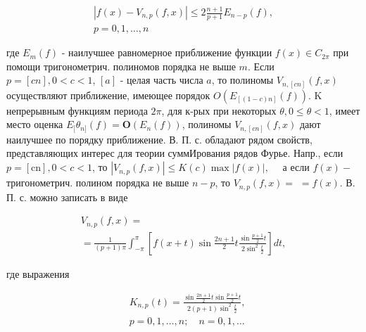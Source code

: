 \documentclass[10pt]{article}
\begin{document}
\[

\begin{gathered}

\left|f(x)-V_{n, p}(f, x)\right| \leqslant 2 \frac{n+1}{p+1} E_{n-p}(f), \\

p=0,1, \ldots, n

\end{gathered}

\]



где $E_{m}(f)$ - наилучшее равномерное приближение функции $f(x) \in C_{2 \pi}$ при помощи тригонометрич. полиномов порядка не выше $m$. Если $p=[c n], 0<c<1$, $[a]$ - целая часть числа $a$, то полиномы $V_{n,[c n]}(f, x)$ осуществляют приближение, имеющее порядок $O\left(E_{[(1-c) n]}(f)\right)$. K непрерывным функциям периода $2 \pi$, для к-рых при некоторых $\theta, 0 \leqslant \theta<1$, имеет место оценка $E_{[} \theta_{n]}(f)=\boldsymbol{O}\left(E_{n}(f)\right)$, полиномы $V_{n,[c n]}(f, x)$ дают наилучшее по порядку приближение. В. П. с. обладают рядом свойств, представляющих интерес для теории суммИрования рядов Фурье. Напр., если $p=[\mathrm{cn}], 0<c<1$, то $\left|V_{n, p}(f, x)\right| \leqslant K(c) \max |f(x)|, \quad$ а если $f(x)-$ тригонометрич. полином порядка не выше $n-p$, то $V_{n, p}(f, x)=$ $=f(x)$. В. П. с. можно записать в виде



\[

\begin{gathered}

V_{n, p}(f, x)= \\

=\frac{1}{(p+1) \pi} \int_{-\pi}^{\pi}\left[f(x+t) \sin \frac{2 n+1}{2} t \frac{\sin \frac{p+1}{2} t}{2 \sin ^{2} \frac{t}{2}}\right] d t,

\end{gathered}

\]



где выражения



\[

\begin{aligned}

& K_{n, p}(t)=\frac{\sin \frac{2 n+1}{2} t \sin \frac{p+1}{2} t}{2(p+1) \sin ^{2} \frac{t}{2}}, \\

& p=0,1, \ldots, n ; \quad n=0,1, \ldots

\end{aligned}

\]
\end{document}
